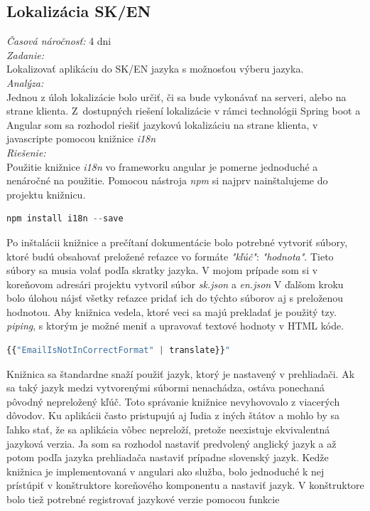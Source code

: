 \documentclass[11pt, oneside]{report}
\begin{document}
\subsection{Lokalizácia SK/EN}
\textit{Časová náročnosť:} 4 dni\\
\textit{Zadanie:}\\
Lokalizovať aplikáciu do SK/EN jazyka s možnosťou výberu jazyka.
\\\textit{Analýza:}\\
Jednou z  úloh  lokalizácie bolo určiť, či sa bude vykonávať na serveri, alebo na strane klienta. Z~dostupných riešení lokalizácie v rámci technológii Spring boot a Angular  som sa rozhodol riešiť jazykovú lokalizáciu na strane klienta, v javascripte pomocou knižnice \textit{i18n}\cite{i18n}
\\\textit{Riešenie:}\\
Použitie knižnice \textit{i18n} vo frameworku angular je pomerne jednoduché a nenáročné na použitie. Pomocou nástroja \textit{npm} si najprv nainštalujeme do projektu knižnicu.
\begin{lstlisting}[language=javascript,showstringspaces=false]
			             	         npm install i18n --save
\end{lstlisting}
Po inštalácii knižnice a  prečítaní dokumentácie  bolo  potrebné vytvoriť súbory, ktoré budú obsahovať preložené reťazce vo formáte \textit{"kľúč"}: \textit{"hodnota"}. Tieto súbory sa  musia volať podľa skratky jazyka. V mojom prípade som si v koreňovom adresári projektu vytvoril súbor \textit{sk.json} a \textit{en.json} V ďalšom kroku  bolo úlohou nájsť všetky reťazce pridať ich do  týchto súborov  aj  s preloženou hodnotou. Aby knižnica vedela, ktoré  veci sa majú prekladať je  použitý tzy. \textit{piping}, s ktorým je možné meniť a upravovať textové hodnoty v HTML kóde.
\begin{lstlisting}[language=Javascript, showstringspaces=false,caption= String interpolation s použitím pipingu na preklad,captionpos=b]
		  		        {{"EmailIsNotInCorrectFormat" | translate}}"
\end{lstlisting}
Knižnica sa štandardne snaží použiť jazyk, ktorý je nastavený v prehliadači. Ak sa taký jazyk  medzi vytvorenými súbormi nenachádza, ostáva ponechaná pôvodný nepreložený kľúč. Toto správanie knižnice  nevyhovovalo z viacerých dôvodov. Ku aplikácii často pristupujú aj ľudia z iných štátov a mohlo by sa ľahko stať, že sa aplikácia vôbec nepreloží, pretože neexistuje ekvivalentná jazyková verzia. Ja som sa rozhodol  nastaviť predvolený anglický jazyk a až potom podľa jazyka prehliadača  nastaviť  prípadne slovenský jazyk. Kedže knižnica je implementovaná v angulari ako služba, bolo jednoduché k nej prístúpiť v konštruktore koreňového komponentu a nastaviť jazyk. V konštruktore bolo  tiež potrebné registrovať jazykové verzie pomocou funkcie 
\end{document}
